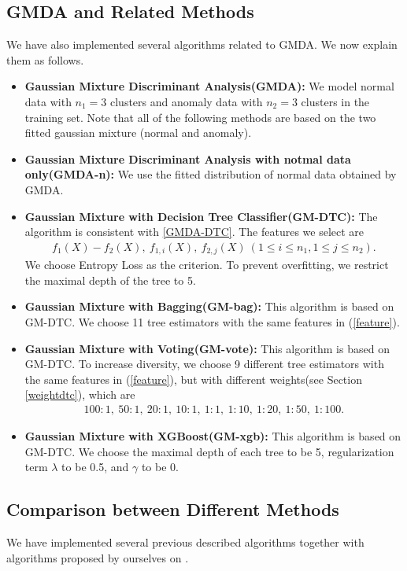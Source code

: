 \documentclass[english]{article}
\newenvironment{eqt}{\begin{equation}\begin{aligned}}{\end{aligned}\end{equation}}
\begin{document}
\subsection{GMDA and Related Methods}
\par We have also implemented several algorithms related to GMDA. We now explain them as follows.
\begin{itemize}
\item \textbf{Gaussian Mixture Discriminant Analysis(GMDA): } We model normal data with $n_1=3$ clusters and anomaly data with $n_2=3$ clusters in the training set. Note that all of the following methods are based on the two fitted gaussian mixture (normal and anomaly). 
\item \textbf{Gaussian Mixture Discriminant Analysis with notmal data only(GMDA-n): } We use the fitted distribution of normal data obtained by GMDA. 
\item \textbf{Gaussian Mixture with Decision Tree Classifier(GM-DTC): } The algorithm is consistent with \ref{GMDA-DTC}. The features we select are
\begin{eqt}
\label{feature}
f_1(X) - f_2(X), \ f_{1, i}(X), \ f_{2, j}(X)\ (1\leqslant i\leqslant n_1, 1\leqslant j\leqslant n_2).
\end{eqt}
We choose Entropy Loss as the criterion. To prevent overfitting, we restrict the maximal depth of the tree to 5. 
\item \textbf{Gaussian Mixture with Bagging(GM-bag): } This algorithm is based on GM-DTC. We choose 11 tree estimators with the same features in (\ref{feature}). 
\item \textbf{Gaussian Mixture with Voting(GM-vote): } This algorithm is based on GM-DTC. To increase diversity, we choose 9 different tree estimators with the same features in (\ref{feature}), but with different weights(see Section \ref{weightdtc}), which are
\begin{eqt}
100:1,\ 50:1,\ 20:1,\ 10:1,\ 1:1,\ 1:10,\ 1:20,\ 1:50,\ 1:100.
\end{eqt}
\item \textbf{Gaussian Mixture with XGBoost(GM-xgb): } This algorithm is based on GM-DTC. We choose the maximal depth of each tree to be 5, regularization term $\lambda$ to be 0.5, and $\gamma$ to be 0.

\end{itemize}

\subsection{Comparison between Different Methods}
\par We have implemented several previous described algorithms together with algorithms proposed by ourselves on .
\end{document}
